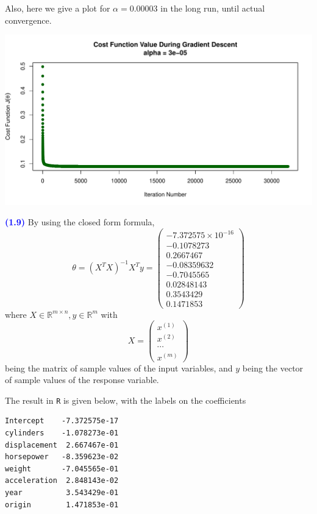 \documentclass[a4paper,12pt]{article}
\newcommand{\code}[1]{\texttt{#1}}
\newcommand{\qnum}[1]{\noindent\textcolor{blue}{\textbf{(#1)}}}
\begin{document}
Also, here we give a plot for $\alpha = 0.00003$ in the long run, until actual convergence.
\begin{center}
    \includegraphics[width=0.9\linewidth]{Images/Prob1-8-alpha4.pdf}
\end{center}
\bigskip


\qnum{1.9}
By using the closed form formula,
\[
    \theta 
    = (X^TX)^{-1}X^Ty
    = \begin{pmatrix}
    -7.372575\times 10^{-16} \\
    -0.1078273 \\ 
    0.2667467 \\ 
    -0.08359632 \\ 
    -0.7045565 \\ 
    0.02848143 \\ 
    0.3543429 \\ 
    0.1471853
    \end{pmatrix}
\]
where $X\in\mathbb{R}^{m\times n}, y\in\mathbb{R}^{m}$ with 
\[
    X = \begin{pmatrix}
        x^{(1)}\\
        x^{(2)}\\
        \cdots\\
        x^{(m)}
    \end{pmatrix}
\]
being the matrix of sample values of the input variables, and $y$ being the vector of sample values of the response variable.

The result in \code{R} is given below, with the labels on the coefficients
\begin{verbatim}
Intercept    -7.372575e-17
cylinders    -1.078273e-01
displacement  2.667467e-01
horsepower   -8.359623e-02
weight       -7.045565e-01
acceleration  2.848143e-02
year          3.543429e-01
origin        1.471853e-01
\end{verbatim}
\end{document}
